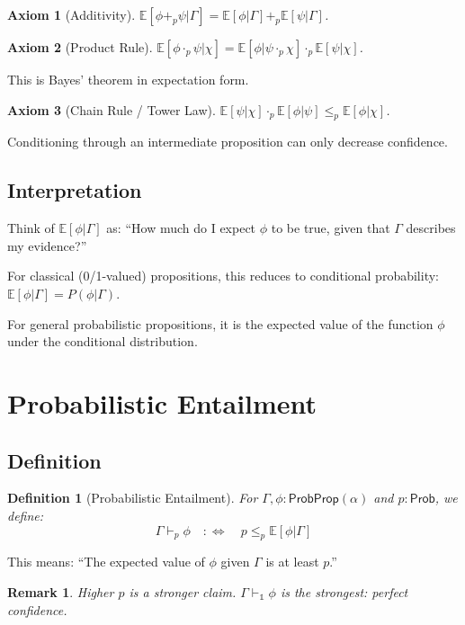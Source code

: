 \documentclass[11pt,a4paper]{article}
\newtheorem{definition}[theorem]{Definition}
\newtheorem{axiom}{Axiom}
\newtheorem{remark}[theorem]{Remark}
\newcommand{\Prob}{\mathsf{Prob}}
\newcommand{\ProbProp}{\mathsf{ProbProp}}
\newcommand{\E}{\mathbb{E}}
\newcommand{\pone}{\mathbb{1}}
\newcommand{\ple}{\leq_p}
\newcommand{\padd}{+_p}
\newcommand{\pmul}{\cdot_p}
\newcommand{\entails}[1]{\vdash_{#1}}
\begin{document}
\begin{axiom}[Additivity]
$\E[\phi \padd \psi|\Gamma] = \E[\phi|\Gamma] \padd \E[\psi|\Gamma]$.
\end{axiom}

\begin{axiom}[Product Rule]
$\E[\phi \pmul \psi|\chi] = \E[\phi|\psi \pmul \chi] \pmul \E[\psi|\chi]$.
\end{axiom}

This is Bayes' theorem in expectation form.

\begin{axiom}[Chain Rule / Tower Law]
$\E[\psi|\chi] \pmul \E[\phi|\psi] \ple \E[\phi|\chi]$.
\end{axiom}

Conditioning through an intermediate proposition can only decrease confidence.

\subsection{Interpretation}

Think of $\E[\phi|\Gamma]$ as: ``How much do I expect $\phi$ to be true, given that $\Gamma$ describes my evidence?''

For classical (0/1-valued) propositions, this reduces to conditional probability: $\E[\phi|\Gamma] = P(\phi|\Gamma)$.

For general probabilistic propositions, it is the expected value of the function $\phi$ under the conditional distribution.

\section{Probabilistic Entailment}

\subsection{Definition}

\begin{definition}[Probabilistic Entailment]
For $\Gamma, \phi : \ProbProp(\alpha)$ and $p : \Prob$, we define:
\[
\Gamma \entails{p} \phi \quad :\Leftrightarrow \quad p \ple \E[\phi|\Gamma]
\]
\end{definition}

This means: ``The expected value of $\phi$ given $\Gamma$ is at least $p$.''

\begin{remark}
Higher $p$ is a stronger claim. $\Gamma \entails{\pone} \phi$ is the strongest: perfect confidence.
\end{remark}
\end{document}
